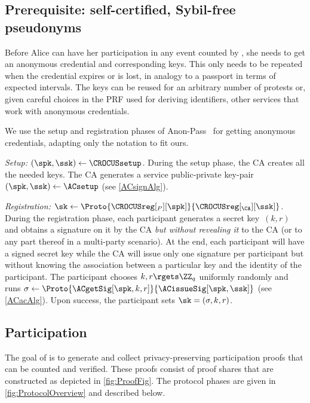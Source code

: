 \subsection{Prerequisite: self-certified, Sybil-free pseudonyms}%
\label{ProtocolSetup}

Before Alice can have her participation in any event counted by
\CROCUS, she needs to get an anonymous credential and corresponding
keys. This only needs to be repeated when the credential expires or is
lost, in analogy to a passport in terms of expected intervals. The
keys can be reused for an arbitrary number of protests or, given
careful choices in the PRF used for deriving identifiers, other
services that work with anonymous credentials. 

We use the setup and registration phases of Anon-Pass~\cite{AnonPass} for
getting anonymous credentials, adapting only the notation to fit ours. 


\emph{Setup: \((\spk, \ssk)\gets \CROCUSsetup\).}
During the setup phase, the \ac{CA} creates all the needed keys.
The \ac{CA} generates a service public-private key-pair \((\spk, \ssk)\gets 
  \ACsetup\) (see \cref{ACsignAlg}).

\emph{Registration: \(\sk\gets 
    \Proto{\CROCUSreg[_P][\spk]}{\CROCUSreg[_{\CA}][\ssk]}\).}
During the registration phase, each participant generates a secret key~\((k, 
  r)\) and obtains a signature on it by the \ac{CA} \emph{but without revealing 
  it} to the \ac{CA} (or to any part thereof in a multi-party scenario).
At the end, each participant will have a signed secret key while the \ac{CA} 
will issue only one signature per participant but without knowing the 
association between a particular key and the identity of the participant.
The participant chooses \(k, r\rgets \ZZ_q\) uniformly randomly and runs 
\(\sigma \gets \Proto{\ACgetSig[\spk, k, r]}{\ACissueSig[\spk, \ssk]}\) (see 
\cref{ACacAlg}).
Upon success, the participant sets \(\sk = (\sigma, k, r)\).



\subsection{Participation}%
\label{ProtocolDuring}


The goal of \CROCUS is to generate and collect privacy-preserving
participation proofs that can be counted and verified. These proofs
consist of proof shares that are constructed as depicted in
\cref{fig:ProofFig}. The protocol phases are given in
\cref{fig:ProtocolOverview} and described below.

